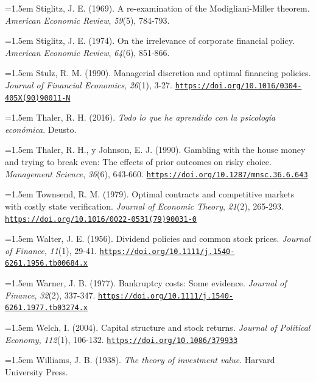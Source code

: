 \documentclass[10pt,a4paper]{article}
\begin{document}
\noindent\hangindent=1.5em Stiglitz, J. E. (1969). A re-examination of the Modigliani-Miller theorem. \textit{American Economic Review}, \textit{59}(5), 784-793.

\noindent\hangindent=1.5em Stiglitz, J. E. (1974). On the irrelevance of corporate financial policy. \textit{American Economic Review}, \textit{64}(6), 851-866.

\noindent\hangindent=1.5em Stulz, R. M. (1990). Managerial discretion and optimal financing policies. \textit{Journal of Financial Economics}, \textit{26}(1), 3-27. \href{https://doi.org/10.1016/0304-405X(90)90011-N}{\nolinkurl{https://doi.org/10.1016/0304-405X(90)90011-N}}

\noindent\hangindent=1.5em Thaler, R. H. (2016). \textit{Todo lo que he aprendido con la psicología económica}. Deusto.

\noindent\hangindent=1.5em Thaler, R. H., y Johnson, E. J. (1990). Gambling with the house money and trying to break even: The effects of prior outcomes on risky choice. \textit{Management Science}, \textit{36}(6), 643-660. \href{https://doi.org/10.1287/mnsc.36.6.643}{\nolinkurl{https://doi.org/10.1287/mnsc.36.6.643}}

\noindent\hangindent=1.5em Townsend, R. M. (1979). Optimal contracts and competitive markets with costly state verification. \textit{Journal of Economic Theory}, \textit{21}(2), 265-293. \href{https://doi.org/10.1016/0022-0531(79)90031-0}{\nolinkurl{https://doi.org/10.1016/0022-0531(79)90031-0}}

\noindent\hangindent=1.5em Walter, J. E. (1956). Dividend policies and common stock prices. \textit{Journal of Finance}, \textit{11}(1), 29-41. \href{https://doi.org/10.1111/j.1540-6261.1956.tb00684.x}{\nolinkurl{https://doi.org/10.1111/j.1540-6261.1956.tb00684.x}}

\noindent\hangindent=1.5em Warner, J. B. (1977). Bankruptcy costs: Some evidence. \textit{Journal of Finance}, \textit{32}(2), 337-347. \href{https://doi.org/10.1111/j.1540-6261.1977.tb03274.x}{\nolinkurl{https://doi.org/10.1111/j.1540-6261.1977.tb03274.x}}

\noindent\hangindent=1.5em Welch, I. (2004). Capital structure and stock returns. \textit{Journal of Political Economy}, \textit{112}(1), 106-132. \href{https://doi.org/10.1086/379933}{\nolinkurl{https://doi.org/10.1086/379933}}

\noindent\hangindent=1.5em Williams, J. B. (1938). \textit{The theory of investment value}. Harvard University Press.
\end{document}
